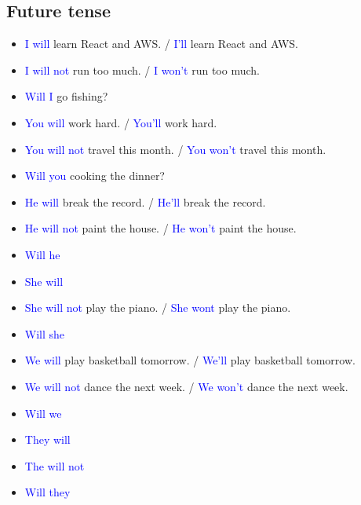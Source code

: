 \subsection{Future tense}
\begin{multicols}{2}
\begin{itemize}
\item \textcolor{blue}{I will} learn React and AWS. / \textcolor{blue}{I'll} learn React and AWS.
\item \textcolor{blue}{I will not} run too much. / \textcolor{blue}{I won't} run too much.
\item \textcolor{blue}{Will I} go fishing?
\item \textcolor{blue}{You will} work hard. / \textcolor{blue}{You'll} work hard.
\item \textcolor{blue}{You will not} travel this month. / \textcolor{blue}{You won't} travel this month.
\item \textcolor{blue}{Will you} cooking the dinner?
\item \textcolor{blue}{He will} break the record. / \textcolor{blue}{He'll} break the record.
\item \textcolor{blue}{He will not} paint the house. / \textcolor{blue}{He won't} paint the house.
\item \textcolor{blue}{Will he}
\item \textcolor{blue}{She will}
\item \textcolor{blue}{She will not} play the piano. / \textcolor{blue}{She wont} play the piano.
\item \textcolor{blue}{Will she}
\item \textcolor{blue}{We will} play basketball tomorrow. / \textcolor{blue}{We'll} play basketball tomorrow.
\item \textcolor{blue}{We will not} dance the next week. / \textcolor{blue}{We won't} dance the next week.
\item \textcolor{blue}{Will we}
\item \textcolor{blue}{They will}
\item \textcolor{blue}{The will not}
\item \textcolor{blue}{Will they}
\end{itemize}
\end{multicols}

